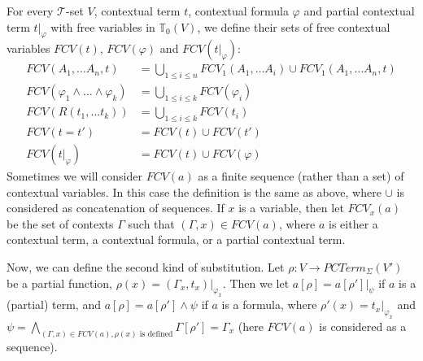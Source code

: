 \documentclass[reqno]{amsart}
\theoremstyle{definition}
\theoremstyle{remark}
\numberwithin{figure}{section}
\begin{document}
For every $\mathcal{T}$-set $V$, contextual term $t$, contextual formula $\varphi$ and partial contextual term $t|_\varphi$ with free variables in $\mathbb{T}_0(V)$,
    we define their sets of free contextual variables $FCV(t)$, $FCV(\varphi)$ and $FCV(t|_\varphi)$:
\begin{align*}
FCV(A_1, \ldots A_n, t) & = \bigcup_{1 \leq i \leq n} FCV_1(A_1, \ldots A_i) \cup FCV_1(A_1, \ldots A_n, t) \\
FCV(\varphi_1 \land \ldots \land \varphi_k) & = \bigcup_{1 \leq i \leq k} FCV(\varphi_i) \\
FCV(R(t_1, \ldots t_k)) & = \bigcup_{1 \leq i \leq k} FCV(t_i) \\
FCV(t = t') & = FCV(t) \cup FCV(t') \\
FCV(t|_\varphi) & = FCV(t) \cup FCV(\varphi)
\end{align*}
Sometimes we will consider $FCV(a)$ as a finite sequence (rather than a set) of contextual variables.
In this case the definition is the same as above, where $\cup$ is considered as concatenation of sequences.
If $x$ is a variable, then let $FCV_x(a)$ be the set of contexts $\Gamma$ such that $(\Gamma,x) \in FCV(a)$,
where $a$ is either a contextual term, a contextual formula, or a partial contextual term.

Now, we can define the second kind of substitution.
Let $\rho : V \to PCTerm_\Sigma(V')$ be a partial function, $\rho(x) = (\Gamma_x,t_x)|_{\varphi_x}$.
Then we let $a[\rho] = a[\rho']|_\psi$ if $a$ is a (partial) term, and $a[\rho] = a[\rho'] \land \psi$ if $a$ is a formula,
    where $\rho'(x) = t_x|_{\varphi_x}$ and $\psi = \bigwedge\limits_{(\Gamma,x) \in FCV(a), \rho(x) \text{ is defined}} \Gamma[\rho'] = \Gamma_x$
    (here $FCV(a)$ is considered as a sequence).
\end{document}
